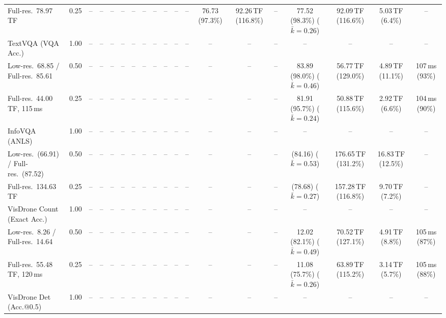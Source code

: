 \begin{table}[t]
{\begin{tabular}{l c | c c c c | c c c c | c c | c c c | c c c c}
{\footnotesize Full-res.\ 78.97\,TF} & 0.25 & -- & -- & -- & -- & -- & -- & -- & -- & -- & -- & 76.73 (97.3\%) & 92.26\,TF (116.8\%) & -- & \cellcolor{gray!15}77.52 (98.3\%) {\footnotesize ($\bar k{=}0.26$)} & 92.09\,TF (116.6\%) & 5.03\,TF (6.4\%) & -- \\
\cmidrule(lr){1-19}
TextVQA (VQA Acc.) & 1.00 & -- & -- & -- & -- & -- & -- & -- & -- & -- & -- & -- & -- & -- & -- & -- & -- & -- \\
{\footnotesize Low-res.\ 68.85 / Full-res.\ 85.61} & 0.50 & -- & -- & -- & -- & -- & -- & -- & -- & -- & -- & -- & -- & -- & 83.89 (98.0\%) {\footnotesize ($\bar k{=}0.46$)} & 56.77\,TF (129.0\%) & 4.89\,TF (11.1\%) & 107\,ms (93\%) \\
{\footnotesize Full-res.\ 44.00\,TF, 115\,ms} & 0.25 & -- & -- & -- & -- & -- & -- & -- & -- & -- & -- & -- & -- & -- & 81.91 (95.7\%) {\footnotesize ($\bar k{=}0.24$)} & 50.88\,TF (115.6\%) & 2.92\,TF (6.6\%) & 104\,ms (90\%) \\
\cmidrule(lr){1-19}
InfoVQA (ANLS) & 1.00 & -- & -- & -- & -- & -- & -- & -- & -- & -- & -- & -- & -- & -- & -- & -- & -- & -- \\
{\footnotesize Low-res.\ (66.91) / Full-res.\ (87.52)} & 0.50 & -- & -- & -- & -- & -- & -- & -- & -- & -- & -- & -- & -- & -- & (84.16) {\footnotesize ($\bar k{=}0.53$)} & 176.65\,TF (131.2\%) & 16.83\,TF (12.5\%) & -- \\
{\footnotesize Full-res.\ 134.63\,TF} & 0.25 & -- & -- & -- & -- & -- & -- & -- & -- & -- & -- & -- & -- & -- & (78.68) {\footnotesize ($\bar k{=}0.27$)} & 157.28\,TF (116.8\%) & 9.70\,TF (7.2\%) & -- \\
\cmidrule(lr){1-19}
VisDrone Count (Exact Acc.) & 1.00 & -- & -- & -- & -- & -- & -- & -- & -- & -- & -- & -- & -- & -- & -- & -- & -- & -- \\
{\footnotesize Low-res.\ 8.26 / Full-res.\ 14.64} & 0.50 & -- & -- & -- & -- & -- & -- & -- & -- & -- & -- & -- & -- & -- & 12.02 (82.1\%) {\footnotesize ($\bar k{=}0.49$)} & 70.52\,TF (127.1\%) & 4.91\,TF (8.8\%) & 105\,ms (87\%) \\
{\footnotesize Full-res.\ 55.48\,TF, 120\,ms} & 0.25 & -- & -- & -- & -- & -- & -- & -- & -- & -- & -- & -- & -- & -- & 11.08 (75.7\%) {\footnotesize ($\bar k{=}0.26$)} & 63.89\,TF (115.2\%) & 3.14\,TF (5.7\%) & 105\,ms (88\%) \\
\cmidrule(lr){1-19}
VisDrone Det (Acc.@0.5) & 1.00 & -- & -- & -- & -- & -- & -- & -- & -- & -- & -- & -- & -- & -- & -- & -- & -- & -- \\

\end{tabular}}
\end{table}
